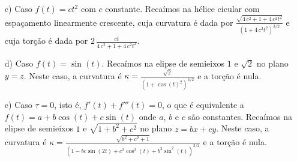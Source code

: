 \begin{ex}
\begin{itemize}
 \item [c)] Caso $f(t)=ct^2$ com $c$ constante. Recaímos na hélice cicular com espaçamento linearmente crescente, cuja curvatura é dada por ${\frac {\sqrt {4\,{c}^{2}+1+4\,{c}^{2}{t}^{2}}}{ \left( 1+4\,{c}^{2}{t
}^{2} \right) ^{3/2}}}$ e cuja torção é dada por $2\,{\frac {ct}{4\,{c}^{2}+1+4\,{c}^{2}{t}^{2}}}$.
 \item [d)] Caso $f(t)=\sin(t)$. Recaímos na elipse de semieixos $1$ e $\sqrt{2}$ no plano $y=z$. Neste caso, a curvatura é $\kappa=\frac{\sqrt{2}}{\left(1+\cos(t)^2\right)^{3/2}}$ e a torção é nula.
 \item [e)] Caso $\tau=0$, isto é, $f'(t)+f'''(t)=0$, o que é equivalente a $f(t)=a+b\cos(t)+c\sin(t)$ onde $a$, $b$ e $c$ são constantes. Recaímos na elipse de semieixos $1$ e $\sqrt{1+b^2+c^2}$ no plano $z=bx+cy$. Neste caso, a curvatura é $\kappa={\frac {\sqrt {b^2+c^2+1}}{\left(1-bc\sin(2t)+c^2\cos^2(t)+b^2\sin^2(t) \right) ^{3/2}}}$ e a torção é nula.
  \end{itemize}

 
 
\end{ex}




% 
%